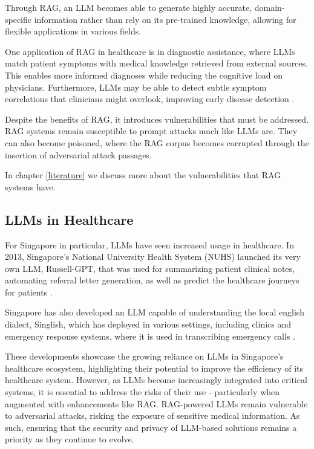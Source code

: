 Through RAG, an LLM becomes able to generate highly accurate, domain-specific information rather than rely on its pre-trained knowledge, allowing for flexible applications in various fields.

One application of RAG in healthcare is in diagnostic assistance, where LLMs match patient symptoms with medical knowledge retrieved from external sources. This enables more informed diagnoses while reducing the cognitive load on physicians. Furthermore, LLMs may be able to detect subtle symptom correlations that clinicians might overlook, improving early disease detection \autocite{jin2024healthllmpersonalizedretrievalaugmenteddisease}.


Despite the benefits of RAG, it introduces vulnerabilities that must be addressed. RAG systems remain susceptible to prompt attacks much like LLMs are. They can also become poisoned, where the RAG corpus becomes corrupted through the insertion of adversarial attack passages.

In chapter \ref{literature} we discuss more about the vulnerabilities that RAG systems have.

\subsection{LLMs in Healthcare}

For Singapore in particular, LLMs have seen increased usage in healthcare. In 2013, Singapore's National University Health System (NUHS) launched its very own LLM, Russell-GPT, that was used for summarizing patient clinical notes, automating referral letter generation, as well as predict the healthcare journeys for patients \autocite{NUHS_2023}.

Singapore has also developed an LLM capable of understanding the local english dialect, Singlish, which has deployed in various settings, including clinics and emergency response systems, where it is used in transcribing emergency calls \autocite{Chia_2024}.

These developments showcase the growing reliance on LLMs in Singapore's healthcare ecosystem, highlighting their potential to improve the efficiency of its healthcare system. However, as LLMs become increasingly integrated into critical systems, it is essential to address the risks of their use - particularly when augmented with enhancements like RAG. RAG-powered LLMs remain vulnerable to adversarial attacks, risking the exposure of sensitive medical information. As such, ensuring that the security and privacy of LLM-based solutions remains a priority as they continue to evolve.
